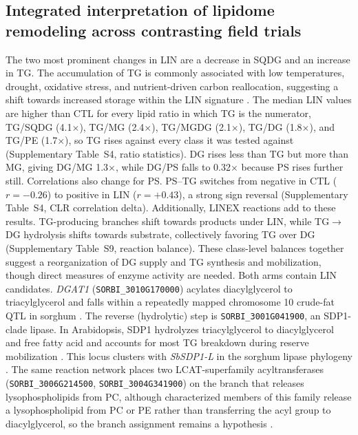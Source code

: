 \documentclass[9pt,twocolumn,twoside]{rilabRxiv}
\begin{document}
\subsection*{Integrated interpretation of lipidome remodeling across contrasting field trials}

The two most prominent changes in LIN are a decrease in SQDG and an increase in TG. The accumulation of TG is commonly associated with low temperatures, drought, oxidative stress, and nutrient-driven carbon reallocation, suggesting a shift towards increased storage within the LIN signature \citep{Tan2018, Yan2025, Pfaff2020}. The median LIN values are higher than CTL for every lipid ratio in which TG is the numerator, TG/SQDG (4.1$\times$), TG/MG (2.4$\times$), TG/MGDG (2.1$\times$), TG/DG (1.8$\times$), and TG/PE (1.7$\times$), so TG rises against every class it was tested against (Supplementary Table~S4, ratio statistics). DG rises less than TG but more than MG, giving DG/MG 1.3$\times$, while DG/PS falls to 0.32$\times$ because PS rises further still. Correlations also change for PS. PS--TG switches from negative in CTL ($r=-0.26$) to positive in LIN ($r=+0.43$), a strong sign reversal (Supplementary Table~S4, CLR correlation delta). Additionally, LINEX reactions add to these results. TG-producing branches shift towards products under LIN, while TG$\rightarrow$DG hydrolysis shifts towards substrate, collectively favoring TG over DG (Supplementary Table~S9, reaction balance). These class-level balances together suggest a reorganization of DG supply and TG synthesis and mobilization, though direct measures of enzyme activity are needed. Both arms contain LIN candidates. \textit{DGAT1} (\texttt{SORBI\_3010G170000}) acylates diacylglycerol to triacylglycerol and falls within a repeatedly mapped chromosome 10 crude-fat QTL in sorghum \citep{Boyles2017DGAT1, Yen2008DGAT}. The reverse (hydrolytic) step is \texttt{SORBI\_3001G041900}, an SDP1-clade lipase. In Arabidopsis, SDP1 hydrolyzes triacylglycerol to diacylglycerol and free fatty acid and accounts for most TG breakdown during reserve mobilization \citep{Kelly2011SDP1L}. This locus clusters with \textit{SbSDP1-L} in the sorghum lipase phylogeny \citep{Sapara2024PLA}. The same reaction network places two LCAT-superfamily acyltransferases (\texttt{SORBI\_3006G214500}, \texttt{SORBI\_3004G341900}) on the branch that releases lysophospholipids from PC, although characterized members of this family release a lysophospholipid from PC or PE rather than transferring the acyl group to diacylglycerol, so the branch assignment remains a hypothesis \citep{Chen2012LCATPLA, Banas2005PSAT}.
\end{document}
